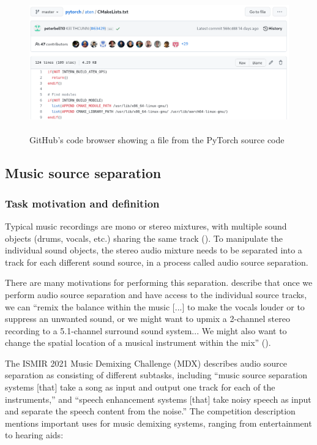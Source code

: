 \documentclass[report.tex]{subfiles}
\begin{document}
\begin{figure}[ht]
	\centering
	\includegraphics[height=6cm]{./images-misc/github.png}
	\caption{GitHub's code browser showing a file from the PyTorch source code}
	\label{fig:githubpytorch}
\end{figure}

\newpagefill

\subsection{Music source separation}
\label{sec:musicsep}

\subsubsection{Task motivation and definition}

Typical music recordings are mono or stereo mixtures, with multiple sound objects (drums, vocals, etc.) sharing the same track (\cite{musicsepintro1}). To manipulate the individual sound objects, the stereo audio mixture needs to be separated into a track for each different sound source, in a process called audio source separation.

There are many motivations for performing this separation. \citeauthor{musicsepgood} describe that once we perform audio source separation and have access to the individual source tracks, we can ``remix the balance within the music [...] to make the vocals louder or to suppress an unwanted sound, or we might want to upmix a 2-channel stereo recording to a 5.1-channel surround sound system... We might also want to change the spatial location of a musical instrument within the mix'' (\cite[1]{musicsepgood}).

The ISMIR 2021 Music Demixing Challenge (MDX)\footnotemark{} describes audio source separation as consisting of different subtasks, including ``music source separation systems [that] take a song as input and output one track for each of the instruments,'' and ``speech enhancement systems [that] take noisy speech as input and separate the speech content from the noise.'' The competition description mentions important uses for music demixing systems, ranging from entertainment to hearing aids:
\end{document}

